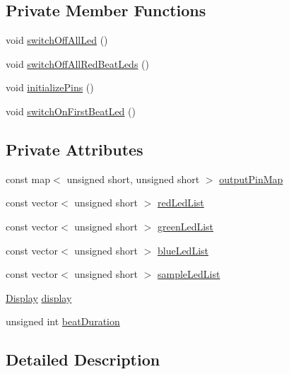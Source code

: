 \subsection*{Private Member Functions}
\begin{DoxyCompactItemize}
\item 
void \hyperlink{class_rasp_output_controller_afdd3bcfa82341a9d2539233abe7cb617}{switch\+Off\+All\+Led} ()
\item 
void \hyperlink{class_rasp_output_controller_a9a5025e13e27544721a80e6725ed23e4}{switch\+Off\+All\+Red\+Beat\+Leds} ()
\item 
void \hyperlink{class_rasp_output_controller_a1172c2966777bbcee89cbe4e6de027d5}{initialize\+Pins} ()
\item 
void \hyperlink{class_rasp_output_controller_a0cacbc3cbca8f1b78318234c6b74e576}{switch\+On\+First\+Beat\+Led} ()
\end{DoxyCompactItemize}
\subsection*{Private Attributes}
\begin{DoxyCompactItemize}
\item 
const map$<$ unsigned short, unsigned short $>$ \hyperlink{class_rasp_output_controller_afd8a9fff94ee9bcf63bcbe6fa810aa32}{output\+Pin\+Map}
\item 
const vector$<$ unsigned short $>$ \hyperlink{class_rasp_output_controller_a8ee2d3ff908d1094cc9d1320133d0bdf}{red\+Led\+List}
\item 
const vector$<$ unsigned short $>$ \hyperlink{class_rasp_output_controller_a8b888abfd8719eb95568abaf53d68d5c}{green\+Led\+List}
\item 
const vector$<$ unsigned short $>$ \hyperlink{class_rasp_output_controller_a9b5e5c4ee94d43d62e41961e6c8bea3b}{blue\+Led\+List}
\item 
const vector$<$ unsigned short $>$ \hyperlink{class_rasp_output_controller_ad0ad19b081450eb1d9cd6548c14a23ea}{sample\+Led\+List}
\item 
\hyperlink{class_display}{Display} \hyperlink{class_rasp_output_controller_a0bb52cfee18c44cd2ed64dea27d5ccc4}{display}
\item 
unsigned int \hyperlink{class_rasp_output_controller_a8c6d21d4749ca4e767dcff93f2c6d7ac}{beat\+Duration}
\end{DoxyCompactItemize}


\subsection{Detailed Description}


